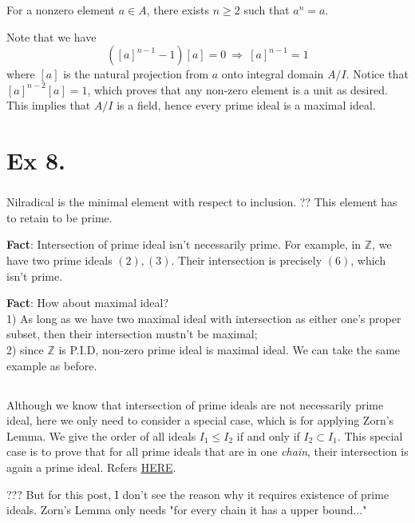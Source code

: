 For a nonzero element $a\in A$, there exists $n\geq 2$ such that $a^n=a$.

Note that we have 
$$([a]^{n-1}-1)[a]=0 ~\Rightarrow~ [a]^{n-1}=1$$ where $[a]$ is the natural projection from $a$ onto integral domain $A/I$. Notice that $[a]^{n-2}[a]=1$, which proves that any non-zero element is a unit as desired. This implies that $A/I$ is a field, hence every prime ideal is a maximal ideal.



\section{Ex 8.}\label{Atiyah Chapter 1 Ex 8.}

\subsubsection{}
Nilradical is the minimal element with respect to inclusion. ?? This element has to retain to be prime.

\textbf{Fact}: Intersection of prime ideal isn't necessarily prime. For example, in $\mathbb Z$, we have two prime ideals $(2),(3)$. Their intersection is precisely $(6)$, which isn't prime.

\textbf{Fact}: How about maximal ideal?\\ 1) As long as we have two maximal ideal with intersection as either one's proper subset, then their intersection mustn't be maximal;\\ 2) since $\mathbb Z$ is P.I.D, non-zero prime ideal is maximal ideal. We can take the same example as before.

\subsection{}
Although we know that intersection of prime ideals are not necessarily prime ideal, here we only need to consider a special case, which is for applying Zorn's Lemma. We give the order of all ideals $I_1\leq I_2$ if and only if $I_2\subset I_1$. This special case is to prove that for all prime ideals that are in one \textit{chain}, their intersection is again a prime ideal. Refers \href{https://math.stackexchange.com/questions/944274/intersection-of-prime-ideals-in-a-chain-is-prime}{HERE}.

??? But for this post, I don't see the reason why it requires existence of prime ideals. Zorn's Lemma only needs "for every chain it has a upper bound..."

